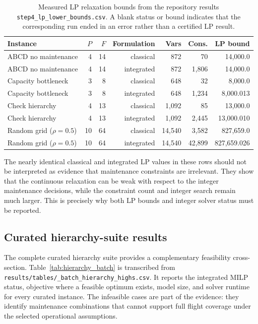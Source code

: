 \begin{table}[t]
\centering\small
\caption{Measured LP relaxation bounds from the repository results
\texttt{step4\_lp\_lower\_bounds.csv}. A blank status or bound indicates that
the corresponding run ended in an error rather than a certified LP result.}
\label{tab:milp_lp_anchor}
\begin{tabular}{lrrrrrr}
\toprule
Instance & $P$ & $F$ & Formulation & Vars & Cons. & LP bound \\
\midrule
ABCD no maintenance & 4 & 14 & classical & 872 & 70 & 14,000.0 \\
ABCD no maintenance & 4 & 14 & integrated & 872 & 1,806 & 14,000.0 \\
Capacity bottleneck & 3 & 8 & classical & 648 & 32 & 8,000.0 \\
Capacity bottleneck & 3 & 8 & integrated & 648 & 1,234 & 8,000.013 \\
Check hierarchy & 4 & 13 & classical & 1,092 & 85 & 13,000.0 \\
Check hierarchy & 4 & 13 & integrated & 1,092 & 2,445 & 13,000.010 \\
Random grid ($\rho=0.5$) & 10 & 64 & classical & 14,540 & 3,582 & 827,659.0 \\
Random grid ($\rho=0.5$) & 10 & 64 & integrated & 14,540 & 42,899 & 827,659.026 \\
\bottomrule
\end{tabular}
\end{table}

The nearly identical classical and integrated LP values in these rows should
not be interpreted as evidence that maintenance constraints are irrelevant.
They show that the continuous relaxation can be weak with respect to the
integer maintenance decisions, while the constraint count and integer search
remain much larger. This is precisely why both LP bounds and integer solver
status must be reported.

\subsection{Curated hierarchy-suite results}
\label{subsec:computational_hierarchy_suite}

The complete curated hierarchy suite provides a complementary feasibility
cross-section. Table~\ref{tab:hierarchy_batch} is transcribed from
\texttt{results/tables/\_batch\_hierarchy\_highs.csv}. It reports the
integrated MILP status, objective where a feasible optimum exists, model size,
and solver runtime for every curated instance. The infeasible cases are part of
the evidence: they identify maintenance combinations that cannot support full
flight coverage under the selected operational assumptions.

